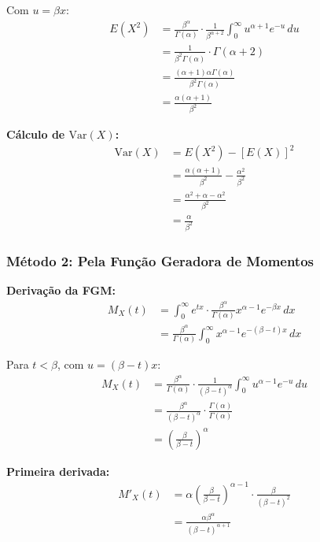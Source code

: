 \documentclass[12pt,a4paper]{article}
\theoremstyle{plain}
\theoremstyle{definition}
\theoremstyle{remark}
\begin{document}
Com \(u = \beta x\):
\begin{align}
E(X^2) &= \frac{\beta^\alpha}{\Gamma(\alpha)} \cdot \frac{1}{\beta^{\alpha+2}} \int_0^{\infty} u^{\alpha+1} e^{-u} \, du \\
&= \frac{1}{\beta^2 \Gamma(\alpha)} \cdot \Gamma(\alpha + 2) \\
&= \frac{(\alpha+1)\alpha \Gamma(\alpha)}{\beta^2 \Gamma(\alpha)} \\
&= \frac{\alpha(\alpha+1)}{\beta^2}
\end{align}

\textbf{Cálculo de \(\text{Var}(X)\):}
\begin{align}
\text{Var}(X) &= E(X^2) - [E(X)]^2 \\
&= \frac{\alpha(\alpha+1)}{\beta^2} - \frac{\alpha^2}{\beta^2} \\
&= \frac{\alpha^2 + \alpha - \alpha^2}{\beta^2} \\
&= \frac{\alpha}{\beta^2}
\end{align}

\subsubsection{Método 2: Pela Função Geradora de Momentos}

\textbf{Derivação da FGM:}
\begin{align}
M_X(t) &= \int_0^{\infty} e^{tx} \cdot \frac{\beta^\alpha}{\Gamma(\alpha)} x^{\alpha-1} e^{-\beta x} \, dx \\
&= \frac{\beta^\alpha}{\Gamma(\alpha)} \int_0^{\infty} x^{\alpha-1} e^{-(\beta - t)x} \, dx
\end{align}

Para \(t < \beta\), com \(u = (\beta - t)x\):
\begin{align}
M_X(t) &= \frac{\beta^\alpha}{\Gamma(\alpha)} \cdot \frac{1}{(\beta-t)^\alpha} \int_0^{\infty} u^{\alpha-1} e^{-u} \, du \\
&= \frac{\beta^\alpha}{(\beta-t)^\alpha} \cdot \frac{\Gamma(\alpha)}{\Gamma(\alpha)} \\
&= \left(\frac{\beta}{\beta-t}\right)^\alpha
\end{align}

\textbf{Primeira derivada:}
\begin{align}
M'_X(t) &= \alpha \left(\frac{\beta}{\beta-t}\right)^{\alpha-1} \cdot \frac{\beta}{(\beta-t)^2} \\
&= \frac{\alpha \beta^\alpha}{(\beta-t)^{\alpha+1}}
\end{align}
\end{document}
